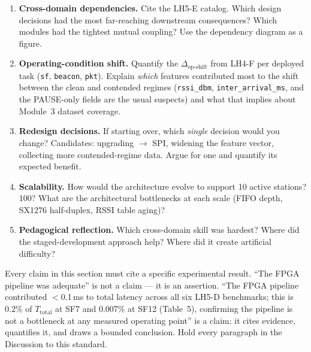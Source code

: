 \documentclass[11pt,letterpaper]{article}
\begin{document}
\begin{enumerate}[leftmargin=2em]
	\item \textbf{Cross-domain dependencies.} Cite the LH5-E catalog. Which design decisions had the most far-reaching downstream consequences? Which modules had the tightest mutual coupling? Use the dependency diagram as a figure.
	\item \textbf{Operating-condition shift.} Quantify the $\Delta_{\text{op-shift}}$ from LH4-F per deployed task (\texttt{sf}, \texttt{beacon}, \texttt{pkt}). Explain \emph{which} features contributed most to the shift between the clean and contended regimes (\texttt{rssi\_dbm}, \texttt{inter\_arrival\_ms}, and the PAUSE-only fields are the usual suspects) and what that implies about Module~3 dataset coverage.
	\item \textbf{Redesign decisions.} If starting over, which \emph{single} decision would you change? Candidates: upgrading \UART{} $\to$ \mbox{SPI}, widening the feature vector, collecting more contended-regime data. Argue for one and quantify its expected benefit.
	\item \textbf{Scalability.} How would the architecture evolve to support 10 active stations? 100? What are the architectural bottlenecks at each scale (FIFO depth, SX1276 half-duplex, RSSI table aging)?
	\item \textbf{Pedagogical reflection.} Which cross-domain skill was hardest? Where did the staged-development approach help? Where did it create artificial difficulty?
\end{enumerate}

\begin{tcolorbox}[infobox={Writing Principle for the Discussion}]
	Every claim in this section must cite a specific experimental result. ``The FPGA pipeline was adequate'' is not a claim --- it is an assertion. ``The FPGA pipeline contributed $<$0.1\,ms to total latency across all six LH5-D benchmarks; this is 0.2\% of $T_{\text{total}}$ at SF7 and 0.007\% at SF12 (Table~5), confirming the pipeline is not a bottleneck at any measured operating point'' is a claim: it cites evidence, quantifies it, and draws a bounded conclusion. Hold every paragraph in the Discussion to this standard.
\end{tcolorbox}
\end{document}
